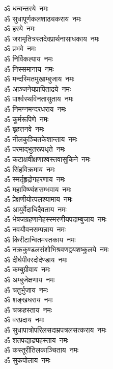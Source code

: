 \begin{multicols}{2}
\begin{flushleft}
ॐ धन्वन्तरये~नमः\\
ॐ सुधापूर्णकलशाढ्यकराय~नमः\\
ॐ हरये~नमः\\
ॐ जरामृतित्रस्तदेवप्रार्थना\-साधकाय~नमः\\
ॐ प्रभवे~नमः\\
ॐ निर्विकल्पाय~नमः\\
ॐ निस्समानाय~नमः\\
ॐ मन्दस्मितमुखाम्बुजाय~नमः\\
ॐ आञ्जनेयप्रापिताद्रये~नमः\\
ॐ पार्श्वस्थविनतासुताय~नमः\hfill{}\\
ॐ निमग्नमन्दरधराय~नमः\\
ॐ कूर्मरूपिणे~नमः\\
ॐ बृहत्तनवे~नमः\\
ॐ नीलकुञ्चितकेशान्ताय~नमः\\
ॐ परमाद्भुतरूपधृते~नमः\\
ॐ कटाक्षवीक्षणाश्वस्त\-वासुकिने~नमः\\
ॐ सिंहविक्रमाय~नमः\\
ॐ स्मर्तृहृद्रोगहरणाय~नमः\\
ॐ महाविष्ण्वंशसम्भवाय~नमः\\
ॐ प्रेक्षणीयोत्पलश्यामाय~नमः\hfill{}\\
ॐ आयुर्वेदाधिदैवताय~नमः\\
ॐ भेषजग्रहणानेहस्स्मरणीय\-पदाम्बुजाय~नमः\\
ॐ नवयौवनसम्पन्नाय~नमः\\
ॐ किरीटान्वितमस्तकाय~नमः\\
ॐ नक्रकुण्डलसंशोभि\-श्रवणद्वयशष्कुलये~नमः\\
ॐ दीर्घपीवरदोर्दण्डाय~नमः\\
ॐ कम्बुग्रीवाय~नमः\\
ॐ अम्बुजेक्षणाय~नमः\\
ॐ चतुर्भुजाय~नमः\\
ॐ शङ्खधराय~नमः\hfill{}\\
ॐ चक्रहस्ताय~नमः\\
ॐ वरप्रदाय~नमः\\
ॐ सुधापात्रोपरिलसदाम्रपत्र\-लसत्कराय~नमः\\
ॐ शतपद्याढ्यहस्ताय~नमः\\
ॐ कस्तूरीतिलकाञ्चिताय~नमः\\
ॐ सुकपोलाय~नमः\\

\end{flushleft}
\end{multicols}
